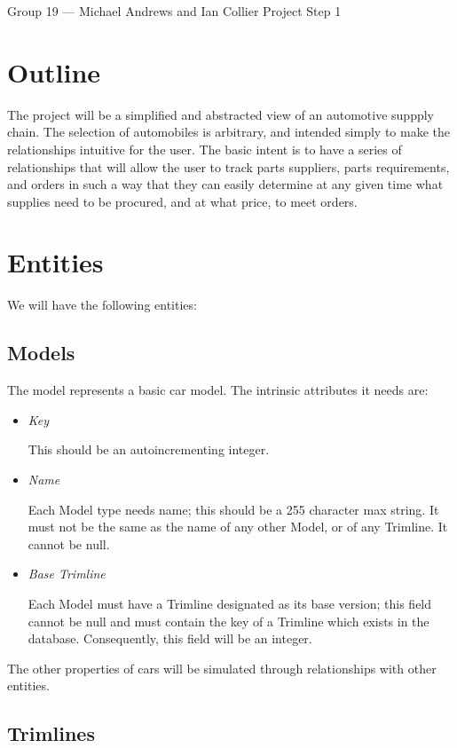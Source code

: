 \documentclass{article}
\begin{document}
Group 19 --- Michael Andrews and Ian Collier
Project Step 1

\section*{Outline}

The project will be a simplified and abstracted view of an automotive suppply chain.  The selection of automobiles is arbitrary, and intended simply to make the relationships intuitive for the user.  The basic intent is to have a series of relationships that will allow the user to track parts suppliers, parts requirements, and orders in such a way that they can easily determine at any given time what supplies need to be procured, and at what price, to meet orders.

\section*{Entities}

We will have the following entities:

\subsection*{Models}
The model represents a basic car model.  The intrinsic attributes it needs are:
\begin{itemize}
	\item \emph{Key}
	
	This should be an autoincrementing integer.	
	
	\item \emph{Name}
	
	Each Model type needs name; this should be a 255 character max string.  It must not be the same as the name of any other Model, or of any Trimline.  It cannot be null.
	
	\item \emph{Base Trimline}
	
	Each Model must have a Trimline designated as its base version; this field cannot be null and must contain the key of a Trimline which exists in the database.  Consequently, this field will be an integer.
	
	
\end{itemize}

The other properties of cars will be simulated through relationships with other entities.

\subsection*{Trimlines}
\end{document}
